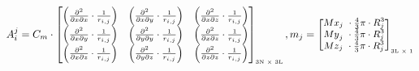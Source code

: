 \begin{singlespace}
\begin{equation} \label{eq:sphere4}
\small A_i^j ={C}_{m} \cdot \left[\begin{matrix}\left(\frac{\partial^2}{\partial x\partial x}\cdot\frac{1}{r_{i,j}}\right)&\left(\frac{\partial^2}{\partial x\partial y}\cdot\frac{1}{r_{i,j}}\right)&\left(\frac{\partial^2}{\partial x\partial z}\cdot\frac{1}{r_{i,j}}\right)\\\left(\frac{\partial^2}{\partial x\partial y}\cdot\frac{1}{r_{i,j}}\right)&\left(\frac{\partial^2}{\partial y\partial y}\cdot\frac{1}{r_{i,j}}\right)&\left(\frac{\partial^2}{\partial x\partial z}\cdot\frac{1}{r_{i,j}}\right)\\\left(\frac{\partial^2}{\partial x\partial z}\cdot\frac{1}{r_{i,j}}\right)&\left(\frac{\partial^2}{\partial y\partial z}\cdot\frac{1}{r_{i,j}}\right)&\left(\frac{\partial^2}{\partial z\partial z}\cdot\frac{1}{r_{i,j}}\right)\\\end{matrix}\right]_{\text{\tiny 3N $\times$ 3L}},
m_j =\left[\begin{matrix}{{Mx}_{j\ }} \cdot \frac{4}{3}\pi\cdot R_j^3\\{{My}_{j\ }} \cdot \frac{4}{3}\pi\cdot R_j^3\\{{Mz}_{j\ }} \cdot \frac{4}{3}\pi\cdot R_j^3\\\end{matrix}\right]_{\text{\tiny 3L $\times$ 1}}
\end{equation}

\begin{FlushRight}
\end{FlushRight}



\end{singlespace}
